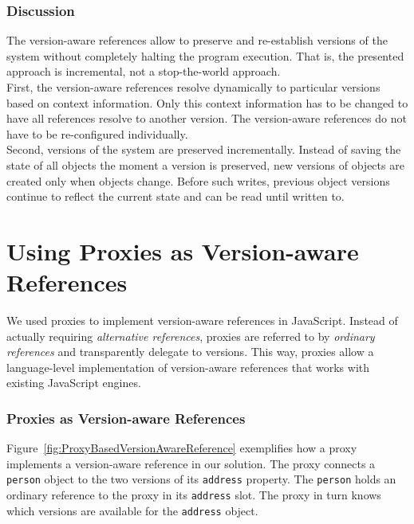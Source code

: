 \subsubsection{Discussion}

The version-aware references allow to preserve and re-establish versions of the system without completely halting the program execution.
That is, the presented approach is incremental, not a stop-the-world approach.\\
First, the version-aware references resolve dynamically to particular versions based on context information.
Only this context information has to be changed to have all references resolve to another version.
The version-aware references do not have to be re-configured individually.\\
Second, versions of the system are preserved incrementally.
Instead of saving the state of all objects the moment a version is preserved, new versions of objects are created only when objects change.
Before such writes, previous object versions continue to reflect the current state and can be read until written to.


\section{Using Proxies as Version-aware References} \label{sec:APPROACH:2}

We used proxies to implement version-aware references in JavaScript.
Instead of actually requiring \emph{alternative references}, proxies are referred to by \emph{ordinary references} and transparently delegate to versions. 
This way, proxies allow a language-level implementation of version-aware references that works with existing JavaScript engines.

\subsubsection{Proxies as Version-aware References}

Figure~\ref{fig:ProxyBasedVersionAwareReference} exemplifies how a proxy implements a version-aware reference in our solution.
The proxy connects a \lstinline{person} object to the two versions of its \lstinline{address} property.
The \lstinline{person} holds an ordinary reference to the proxy in its \lstinline{address} slot.
The proxy in turn knows which versions are available for the \lstinline{address} object.

